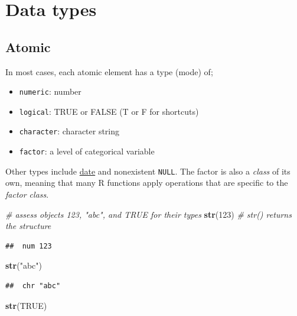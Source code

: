 \documentclass[]{book}
\newenvironment{Shaded}{\begin{snugshade}}{\end{snugshade}}
\newcommand{\KeywordTok}[1]{\textcolor[rgb]{0.13,0.29,0.53}{\textbf{{#1}}}}
\newcommand{\DecValTok}[1]{\textcolor[rgb]{0.00,0.00,0.81}{{#1}}}
\newcommand{\StringTok}[1]{\textcolor[rgb]{0.31,0.60,0.02}{{#1}}}
\newcommand{\CommentTok}[1]{\textcolor[rgb]{0.56,0.35,0.01}{\textit{{#1}}}}
\newcommand{\OtherTok}[1]{\textcolor[rgb]{0.56,0.35,0.01}{{#1}}}
\newcommand{\NormalTok}[1]{{#1}}
\theoremstyle{definition}
\theoremstyle{definition}
\theoremstyle{remark}
\begin{document}
\section{Data types}\label{data-types}

\subsection{Atomic}\label{atomic}

In most cases, each atomic element has a type (mode) of;

\begin{itemize}
\item
  \texttt{numeric}: number
\item
  \texttt{logical}: TRUE or FALSE (T or F for shortcuts)
\item
  \texttt{character}: character string
\item
  \texttt{factor}: a level of categorical variable
\end{itemize}

Other types include
\href{http://www.statmethods.net/input/dates.html}{date} and nonexistent
\texttt{NULL}. The factor is also a \emph{class} of its own, meaning
that many R functions apply operations that are specific to the
\emph{factor class}.

\begin{Shaded}
\begin{Highlighting}[]
\CommentTok{# assess objects 123, "abc", and TRUE for their types }
\KeywordTok{str}\NormalTok{(}\DecValTok{123}\NormalTok{)  }\CommentTok{# str() returns the structure}
\end{Highlighting}
\end{Shaded}

\begin{verbatim}
##  num 123
\end{verbatim}

\begin{Shaded}
\begin{Highlighting}[]
\KeywordTok{str}\NormalTok{(}\StringTok{"abc"}\NormalTok{)}
\end{Highlighting}
\end{Shaded}

\begin{verbatim}
##  chr "abc"
\end{verbatim}

\begin{Shaded}
\begin{Highlighting}[]
\KeywordTok{str}\NormalTok{(}\OtherTok{TRUE}\NormalTok{)}
\end{Highlighting}
\end{Shaded}
\end{document}
